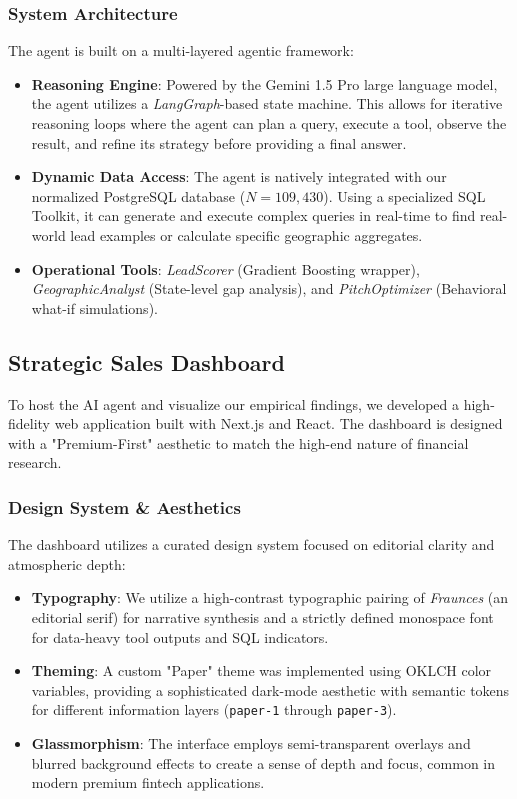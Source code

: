 \documentclass[conference]{IEEEtran}
\begin{document}
\subsubsection{System Architecture}
The agent is built on a multi-layered agentic framework:
\begin{itemize}
    \item \textbf{Reasoning Engine}: Powered by the Gemini 1.5 Pro large language model, the agent utilizes a \textit{LangGraph}-based state machine. This allows for iterative reasoning loops where the agent can plan a query, execute a tool, observe the result, and refine its strategy before providing a final answer.
    \item \textbf{Dynamic Data Access}: The agent is natively integrated with our normalized PostgreSQL database ($N=109{,}430$). Using a specialized SQL Toolkit, it can generate and execute complex queries in real-time to find real-world lead examples or calculate specific geographic aggregates.
    \item \textbf{Operational Tools}: \textit{LeadScorer} (Gradient Boosting wrapper), \textit{GeographicAnalyst} (State-level gap analysis), and \textit{PitchOptimizer} (Behavioral what-if simulations).
\end{itemize}

\subsection{Strategic Sales Dashboard}
To host the AI agent and visualize our empirical findings, we developed a high-fidelity web application built with Next.js and React. The dashboard is designed with a "Premium-First" aesthetic to match the high-end nature of financial research.

\subsubsection{Design System \& Aesthetics}
The dashboard utilizes a curated design system focused on editorial clarity and atmospheric depth:
\begin{itemize}
    \item \textbf{Typography}: We utilize a high-contrast typographic pairing of \textit{Fraunces} (an editorial serif) for narrative synthesis and a strictly defined monospace font for data-heavy tool outputs and SQL indicators.
    \item \textbf{Theming}: A custom "Paper" theme was implemented using OKLCH color variables, providing a sophisticated dark-mode aesthetic with semantic tokens for different information layers (\texttt{paper-1} through \texttt{paper-3}).
    \item \textbf{Glassmorphism}: The interface employs semi-transparent overlays and blurred background effects to create a sense of depth and focus, common in modern premium fintech applications.
\end{itemize}
\end{document}
